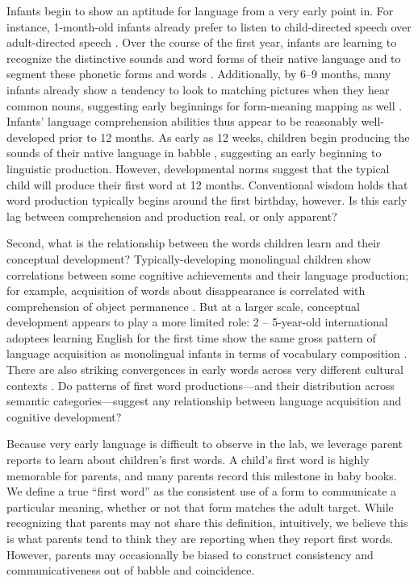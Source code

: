 \documentclass[10pt,letterpaper]{article}
\begin{document}
Infants begin to show an aptitude for language from a very early point in. For instance, 1-month-old infants already prefer to listen to child-directed speech over adult-directed speech \cite{cooper1990}. Over the course of the first year, infants are learning to recognize the distinctive sounds and word forms of their native language \cite{kuhl2004} and to segment these phonetic forms and words \cite{werker2005}. Additionally, by 6--9 months, many infants already show a tendency to look to matching pictures when they hear common nouns, suggesting early beginnings for form-meaning mapping as well \cite{tincoff1999,tincoff2012,bergelson2012}. Infants' language comprehension abilities thus appear to be reasonably well-developed prior to 12 months. As early as 12 weeks, children begin producing the sounds of their native language in babble \cite{kuhl1996}, suggesting an early beginning to linguistic production. However, developmental norms suggest that the typical child will produce their first word at 12 months. Conventional wisdom holds that word production typically begins around the first birthday, however. Is this early lag between comprehension and production real, or only apparent?

Second, what is the relationship between the words children learn and their conceptual development? Typically-developing monolingual children show correlations between some cognitive achievements and their language production; for example, acquisition of words about disappearance is correlated with comprehension of object permanence \cite{gopnik1986}. But at a larger scale, conceptual development appears to play a more limited role: 2 -- 5-year-old international adoptees learning English for the first time show the same gross pattern of language acquisition as monolingual infants in terms of vocabulary composition \cite{snedeker2007}. There are also striking convergences in early words across very different cultural contexts \cite{tardif2007}. Do patterns of first word productions---and their distribution across semantic categories---suggest any relationship between language acquisition and cognitive development? 

Because very early language is difficult to observe in the lab, we leverage parent reports to learn about children's first words. A child's first word is highly memorable for parents, and many parents record this milestone in baby books. We define a true ``first word'' as the consistent use of a form to communicate a particular meaning, whether or not that form matches the adult target. While recognizing that parents may not share this definition, intuitively, we believe this is what parents tend to think they are reporting when they report first words. However, parents may occasionally be biased to construct consistency and communicativeness out of babble and coincidence.
\end{document}
